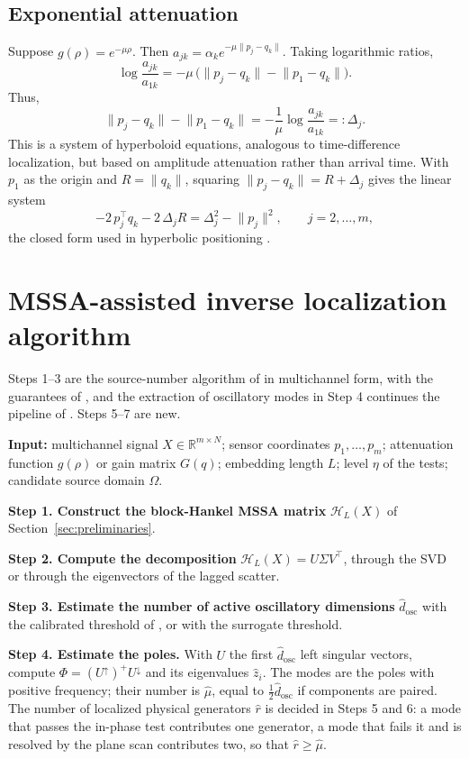 \documentclass{article}
\begin{document}
\subsection{Exponential attenuation}\label{sec:exponential-attenuation}

Suppose $g(\rho) = e^{-\mu\rho}$. Then $a_{jk} = \alpha_k e^{-\mu \lVert p_j - q_k \rVert}$. Taking logarithmic ratios, \[
\log \frac{a_{jk}}{a_{1k}} = -\mu\, \bigl( \lVert p_j - q_k \rVert - \lVert p_1 - q_k \rVert \bigr).
\] Thus, \[
\lVert p_j - q_k \rVert - \lVert p_1 - q_k \rVert = -\frac{1}{\mu} \log \frac{a_{jk}}{a_{1k}} =: \Delta_j .
\] This is a system of hyperboloid equations, analogous to time-difference localization, but based on amplitude attenuation rather than arrival time. With $p_1$ as the origin and $R = \lVert q_k \rVert$, squaring $\lVert p_j - q_k \rVert = R + \Delta_j$ gives the linear system \[
-2\, p_j^{\top} q_k - 2\, \Delta_j R = \Delta_j^{2} - \lVert p_j \rVert^{2}, \qquad j = 2, \dots, m,
\] the closed form used in hyperbolic positioning \cite{ref-Chan}.

\section{MSSA-assisted inverse localization algorithm}\label{sec:mssa-assisted-inverse-localization}

Steps 1--3 are the source-number algorithm of \cite{ref-BernadotteBuchstaber, ref-Bernadotte05} in multichannel form, with the guarantees of \cite{ref-companionA}, and the extraction of oscillatory modes in Step 4 continues the pipeline of \cite{ref-Bernadotte06}. Steps 5--7 are new.

\textbf{Input:} multichannel signal $X \in \mathbb{R}^{m \times N}$; sensor coordinates $p_1, \dots, p_m$; attenuation function $g(\rho)$ or gain matrix $G(q)$; embedding length $L$; level $\eta$ of the tests; candidate source domain $\Omega$.

\textbf{Step 1. Construct the block-Hankel MSSA matrix} $\mathcal{H}_L(X)$ of Section~\ref{sec:preliminaries}.

\textbf{Step 2. Compute the decomposition} $\mathcal{H}_L(X) = U \Sigma V^{\top}$, through the SVD or through the eigenvectors of the lagged scatter.

\textbf{Step 3. Estimate the number of active oscillatory dimensions} $\widehat{d}_{\mathrm{osc}}$ with the calibrated threshold of \cite{ref-companionA}, or with the surrogate threshold.

\textbf{Step 4. Estimate the poles.} With $U$ the first $\widehat{d}_{\mathrm{osc}}$ left singular vectors, compute $\Phi = (U^{\uparrow})^{+} U^{\downarrow}$ and its eigenvalues $\widehat{z}_i$. The modes are the poles with positive frequency; their number is $\widehat{\mu}$, equal to $\tfrac{1}{2} \widehat{d}_{\mathrm{osc}}$ if components are paired. The number of localized physical generators $\widehat{r}$ is decided in Steps 5 and 6: a mode that passes the in-phase test contributes one generator, a mode that fails it and is resolved by the plane scan contributes two, so that $\widehat{r} \ge \widehat{\mu}$.
\end{document}
